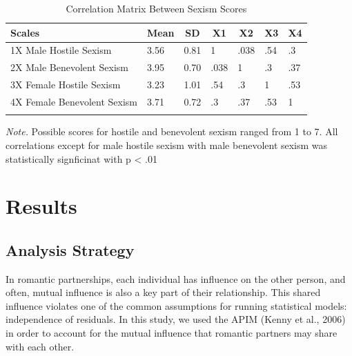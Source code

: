 \documentclass[
  man]{apa6}
\begin{document}
\begin{table}[tbp]

\begin{center}
\begin{threeparttable}

\caption{\label{tab:unnamed-chunk-2}Correlation Matrix Between Sexism Scores}

\begin{tabular}{lllllll}
\toprule
Scales & \multicolumn{1}{c}{Mean} & \multicolumn{1}{c}{SD} & \multicolumn{1}{c}{X1} & \multicolumn{1}{c}{X2} & \multicolumn{1}{c}{X3} & \multicolumn{1}{c}{X4}\\
\midrule
1X Male Hostile Sexism & 3.56 & 0.81 & 1 & .038 & .54 & .3\\
2X Male Benevolent Sexism & 3.95 & 0.70 & .038 & 1 & .3 & .37\\
3X Female Hostile Sexism & 3.23 & 1.01 & .54 & .3 & 1 & .53\\
4X Female Benevolent Sexism & 3.71 & 0.72 & .3 & .37 & .53 & 1\\
\bottomrule
\addlinespace
\end{tabular}

\begin{tablenotes}[para]
\normalsize{\textit{Note.} Possible scores for hostile and benevolent sexism ranged from 1 to 7. All correlations except for male hostile sexism with male benevolent sexism was statistically signficinat with p < .01}
\end{tablenotes}

\end{threeparttable}
\end{center}

\end{table}

\hypertarget{results}{%
\section{Results}\label{results}}

\hypertarget{analysis-strategy}{%
\subsection{Analysis Strategy}\label{analysis-strategy}}

In romantic partnerships, each individual has influence on the other person, and often, mutual influence is also a key part of their relationship. This shared influence violates one of the common assumptions for running statistical models: independence of residuals. In this study, we used the APIM (Kenny et al., 2006) in order to account for the mutual influence that romantic partners may share with each other.
\end{document}
